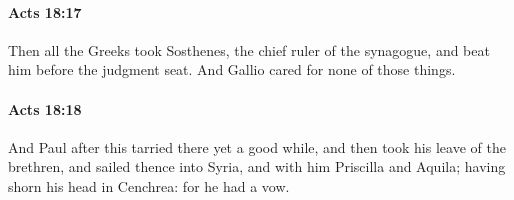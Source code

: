 		\paragraph{Acts 18:17} %
			\label{ACTS-18-17}

			Then all the Greeks took Sosthenes, the chief ruler of the synagogue, and beat him before the judgment seat.  And Gallio cared for none of those things.

			\begin{framed}
			\scriptsize
				\begin{compactdesc}
					\item[SBLG] 
				\end{compactdesc}
			\end{framed}

		\paragraph{Acts 18:18} %
			\label{ACTS-18-18}

			And Paul after this tarried there yet a good while, and then took his leave of the brethren, and sailed thence into Syria, and with him Priscilla and Aquila; having shorn his head in Cenchrea: for he had a vow.

